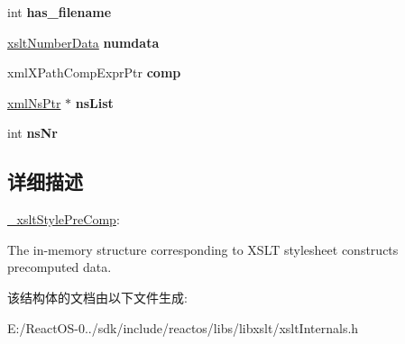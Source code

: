 \begin{DoxyCompactItemize}
int {\bfseries has\+\_\+filename}
\item 
\mbox{\label{struct__xslt_style_pre_comp_aea8737735d8421af6856d0b8b3e06289}} 
\hyperlink{struct__xslt_number_data}{xslt\+Number\+Data} {\bfseries numdata}
\item 
\mbox{\label{struct__xslt_style_pre_comp_ada089de4711a68135500e633f9cb06df}} 
xml\+X\+Path\+Comp\+Expr\+Ptr {\bfseries comp}
\item 
\mbox{\label{struct__xslt_style_pre_comp_a5777ef24b0953a0931703808f13e862b}} 
\hyperlink{struct__xml_ns}{xml\+Ns\+Ptr} $\ast$ {\bfseries ns\+List}
\item 
\mbox{\label{struct__xslt_style_pre_comp_abfdfa2c7bdbd58f9cb437f53cc624dca}} 
int {\bfseries ns\+Nr}
\end{DoxyCompactItemize}


\subsection{详细描述}
\hyperlink{struct__xslt_style_pre_comp}{\+\_\+xslt\+Style\+Pre\+Comp}\+:

The in-\/memory structure corresponding to X\+S\+LT stylesheet constructs precomputed data. 

该结构体的文档由以下文件生成\+:\begin{DoxyCompactItemize}
\item 
E\+:/\+React\+O\+S-\/0../sdk/include/reactos/libs/libxslt/xslt\+Internals.\+h\end{DoxyCompactItemize}
